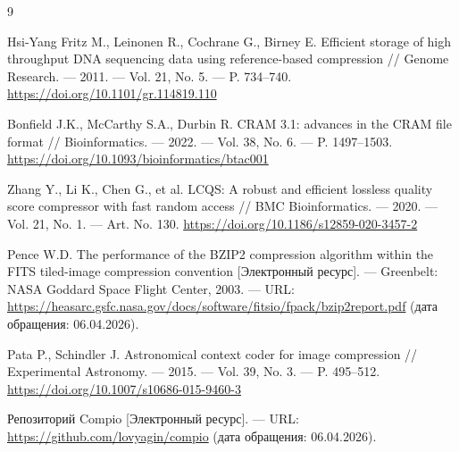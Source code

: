 \begin{thebibliography}{9}

    Hsi-Yang Fritz M., Leinonen R., Cochrane G., Birney E.
    Efficient storage of high throughput DNA sequencing data using reference-based compression //
    Genome Research. --- 2011. --- Vol. 21, No. 5. --- P. 734--740.
    \href{https://doi.org/10.1101/gr.114819.110}{https://doi.org/10.1101/gr.114819.110}

    Bonfield J.K., McCarthy S.A., Durbin R.
    CRAM 3.1: advances in the CRAM file format //
    Bioinformatics. --- 2022. --- Vol. 38, No. 6. --- P. 1497--1503.
    \href{https://doi.org/10.1093/bioinformatics/btac001}{https://doi.org/10.1093/bioinformatics/btac001}

    Zhang Y., Li K., Chen G., et al.
    LCQS: A robust and efficient lossless quality score compressor with fast random access //
    BMC Bioinformatics. --- 2020. --- Vol. 21, No. 1. --- Art. No. 130.
    \href{https://doi.org/10.1186/s12859-020-3457-2}{https://doi.org/10.1186/s12859-020-3457-2}

    Pence W.D.
    The performance of the BZIP2 compression algorithm within the FITS tiled-image compression convention
    [Электронный ресурс]. --- Greenbelt: NASA Goddard Space Flight Center, 2003. ---
    URL: \href{https://heasarc.gsfc.nasa.gov/docs/software/fitsio/fpack/bzip2report.pdf}{https://heasarc.gsfc.nasa.gov/docs/software/fitsio/fpack/bzip2report.pdf}
    (дата обращения: 06.04.2026).

    Pata P., Schindler J.
    Astronomical context coder for image compression //
    Experimental Astronomy. --- 2015. --- Vol. 39, No. 3. --- P. 495--512.
    \href{https://doi.org/10.1007/s10686-015-9460-3}{https://doi.org/10.1007/s10686-015-9460-3}

    Репозиторий Compio [Электронный ресурс]. ---
    URL: \href{https://github.com/lovyagin/compio}{https://github.com/lovyagin/compio}
    (дата обращения: 06.04.2026).

\end{thebibliography}